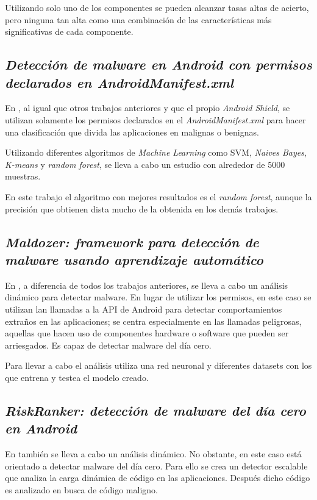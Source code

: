 Utilizando solo uno de los componentes se pueden alcanzar tasas altas de acierto, pero ninguna tan alta como una combinación de las características más significativas de cada componente.

\subsection{\textit{Detección de malware en Android con permisos declarados en AndroidManifest.xml}}

En \hypersetup{citecolor=red}\cite{todd}, al igual que otros trabajos anteriores y que el propio \textit{Android Shield}, se utilizan solamente los permisos declarados en el \textit{AndroidManifest.xml} para hacer una clasificación que divida las aplicaciones en malignas o benignas.

Utilizando diferentes algoritmos de \textit{Machine Learning} como SVM, \textit{Naives Bayes}, \textit{K-means} y \textit{random forest}, se lleva a cabo un estudio con alrededor de 5000 muestras.

En este trabajo el algoritmo con mejores resultados es el \textit{random forest}, aunque la precisión que obtienen dista mucho de la obtenida en los demás trabajos.

\subsection{\textit{Maldozer: framework para detección de malware usando aprendizaje automático}}

En \hypersetup{citecolor=red}\cite{maldozer}, a diferencia de todos los trabajos anteriores, se lleva a cabo un análisis dinámico para detectar malware. En lugar de utilizar los permisos, en este caso se utilizan lan llamadas a la API de Android para detectar comportamientos extraños en las aplicaciones; se centra especialmente en las llamadas peligrosas, aquellas que hacen uso de componentes hardware o software que pueden ser arriesgados. Es capaz de detectar malware del día cero.

Para llevar a cabo el análisis utiliza una red neuronal y diferentes datasets con los que entrena y testea el modelo creado.

\subsection{\textit{RiskRanker: detección de malware del día cero en Android}}

En \hypersetup{citecolor=red}\cite{grace} también se lleva a cabo un análisis dinámico. No obstante, en este caso está orientado a detectar malware del día cero. Para ello se crea un detector escalable que analiza la carga dinámica de código en las aplicaciones. Después dicho código es analizado en busca de código maligno.

